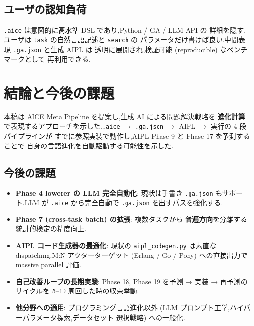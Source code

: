 \documentclass[11pt,a4paper]{article}
\newcommand{\code}[1]{\texttt{\small #1}}
\begin{document}
\subsection{ユーザの認知負荷}

\code{.aice} は意図的に高水準 DSL であり,Python / GA / LLM API の
詳細を隠す.ユーザは \code{task} の自然言語記述と \code{search} の
パラメータだけ書けば良い.中間表現 \code{.ga.json} と生成 AIPL は
透明に展開され,検証可能 (reproducible) なベンチマークとして
再利用できる.

\section{結論と今後の課題}
\label{sec:conc}

本稿は AICE Meta Pipeline を提案し,生成 AI による問題解決戦略を
\textbf{進化計算} で表現するアプローチを示した.\code{.aice} $\to$
\code{.ga.json} $\to$ AIPL $\to$ 実行の 4 段パイプラインが
すでに参照実装で動作し,AIPL Phase 9 と Phase 17 を予測することで
自身の言語進化を自動駆動する可能性を示した.

\subsection*{今後の課題}

\begin{itemize}[leftmargin=*,itemsep=0pt]
  \item \textbf{Phase 4 lowerer の LLM 完全自動化}: 現状は手書き
    \code{.ga.json} もサポート.LLM が \code{.aice} から完全自動で
    \code{.ga.json} を出すパスを強化する.
  \item \textbf{Phase 7 (cross-task batch) の拡張}: 複数タスクから
    \textbf{普遍方向}を分離する統計的検定の精度向上.
  \item \textbf{AIPL コード生成器の最適化}: 現状の \code{aipl\_codegen.py}
    は素直な dispatching.M:N アクターターゲット (Erlang / Go / Pony)
    への直接出力で massive parallel 評価.
  \item \textbf{自己改善ループの長期実験}: Phase 18, Phase 19 を予測 →
    実装 → 再予測のサイクルを 5--10 周回した時の収束挙動.
  \item \textbf{他分野への適用}: プログラミング言語進化以外
    (LLM プロンプト工学,ハイパーパラメータ探索,データセット
    選択戦略) への一般化.
\end{itemize}
\end{document}
